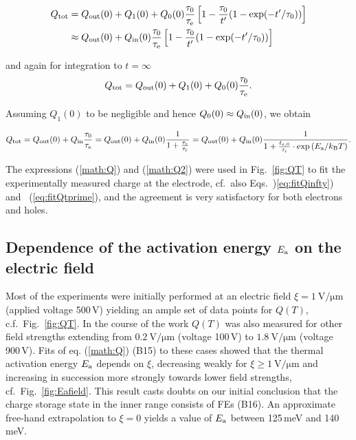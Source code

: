\begin{align}
 Q_{\textrm{tot}} &= Q_{\textrm{out}}(0) + Q_1(0) + Q_0(0) \frac{\tau_{0}}{\tau_\textrm{e}}\left[ 1 - \frac{\tau_{0}}{t'}(1 - \exp(-t'/\tau_{0})) \right]\\ 
 &\approx Q_{\textrm{out}}(0) + Q_{\textrm{in}}(0) \frac{\tau_{0}}{\tau_\textrm{e}}\left[ 1 - \frac{\tau_{0}}{t'}(1 - \exp(-t'/\tau_{0})) \right]
 \label{math:Q}
\end{align}

\noindent
and again for integration to $t = \infty$
\begin{equation}
 Q_{\textrm{tot}} = Q_{\textrm{out}}(0) + Q_1(0) + Q_0(0) \frac{\tau_{0}}{\tau_\textrm{e}}.
\end{equation}

\noindent
Assuming $Q_1(0)$ to be negligible and hence $Q_0(0) \approx Q_{\textrm{in}}(0)$, we obtain

\begin{equation}
 Q_{\textrm{tot}} = Q_{\textrm{out}}(0) + Q_{\textrm{in}} \frac{\tau_{0}}{\tau_\textrm{e}} = Q_{\textrm{out}}(0) + Q_{\textrm{in}}(0) \frac{1}{1+\frac{\tau_\textrm{e}}{\tau_\textrm{r}}} = Q_{\textrm{out}}(0) + Q_{\textrm{in}}(0) \frac{1}{1+\frac{t_{e,0}}{\tau_\textrm{r}}\cdot \exp{\left( E_{\textrm{a}}/k_{\textrm{B}}T \right)}}. 
 \label{math:Q2}
\end{equation}

\noindent
The expressions (\ref{math:Q}) and (\ref{math:Q2}) were used in Fig.~\ref{fig:QT} to fit the experimentally measured charge at the electrode, cf.\ also Eqs.~)\ref{eq:fitQinfty}) and ~(\ref{eq:fitQtprime}),
 and the agreement is very satisfactory for both electrons and holes. 


\subsection{Dependence of the activation energy $E_{\textrm{a}}$ on the electric field}

Most of the experiments were initially performed at an electric field  $\xi = \SI{1}{\volt/\um}$ (applied voltage 500\,V) yielding an ample set of data points for $Q(T)$, c.f.\ Fig.~\ref{fig:QT}. 
In the course of the work $Q(T)$ was also measured for other field strengths extending from $\SI{0.2}{\volt/\um}$ (voltage 100\,V) to $\SI{1.8}{\volt/\um}$ (voltage 900\,V). 
Fits of eq. (\ref{math:Q}) {\color{red}(B15)} to these cases showed that the thermal activation energy $E_{\textrm{a}}$ depends on $\xi$, decreasing weakly for $\xi \geq \SI{1}{\volt/\um}$
 and increasing in succession more strongly towards lower field strengths, cf.\ Fig.~\ref{fig:Eafield}. 
This result casts doubts on our initial conclusion that the charge storage state in the inner range consists of FEs {\color{red}(B16)}. 
An approximate free-hand extrapolation to $\xi = 0$ yields a value of $E_{\textrm{a}}$ between 125\,meV and 140\,meV.

